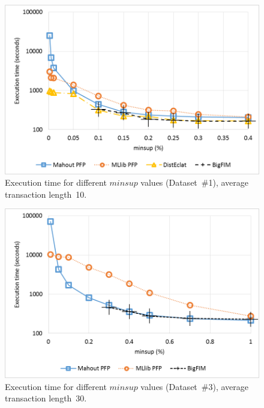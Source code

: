 \begin{figure}[!t]
\includegraphics[width=5in]{chapters/survey/immagini/minsup_1_log.png}
\caption{Execution time for different $minsup$ values
(Dataset~\#1), average transaction length~10.}
\label{minsup_1}
\end{figure}




\begin{figure}[!t]
\includegraphics[width=5in]{chapters/survey/immagini/minsup_3_log.png}
\caption{Execution time for different $minsup$ values
(Dataset~\#3), average transaction length~30.}
\label{minsup_3}
\end{figure}



